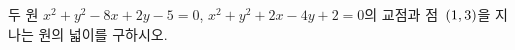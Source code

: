 두 원 $x^2+y^2-8x+2y-5=0$, $x^2+y^2+2x-4y+2=0$의 교점과 점~$(1{,}\mkern3mu\mathopen{}3)$을 지나는 원의 넓이를 구하시오.
